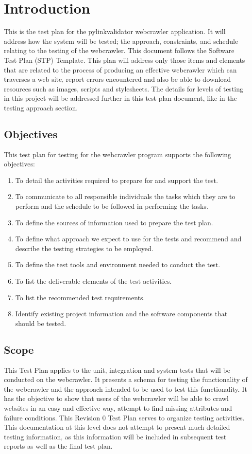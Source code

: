 \documentclass[12pt, titlepage]{article}
\begin{document}
\section{Introduction}
This is the test plan for the pylinkvalidator webcrawler application.  It will address how the system will be tested; the approach, constraints, and schedule relating to the testing of the webcrawler. This document follows the Software Test Plan (STP) Template.
This plan will address only those items and elements that are related to the process of producing an effective webcrawler which can traverses a web site, report errors encountered and also be able to download resources such as images, scripts and stylesheets. The details for levels of testing in this project will be addressed further in this test plan document, like in the testing approach section.

\subsection{Objectives}
This test plan for testing for the webcrawler program supports the following objectives:

\begin{enumerate}
\item To detail the activities required to prepare for and support the test.
\item To communicate to all responsible individuals the tasks which they are to perform and the schedule to be followed in performing the tasks.
\item To define the sources of information used to prepare the test plan.
\item To define what approach we expect to use for the tests and recommend and describe the testing strategies to be employed.
\item To define the test tools and environment needed to conduct the test.
\item To list the deliverable elements of the test activities.
\item  To list the recommended test requirements.
\item  Identify existing project information and the software components that should be tested.
\end{enumerate}

\subsection{Scope}
This Test Plan applies to the unit,  integration and system tests that will be conducted on the webcrawler. It presents a schema for testing the functionality of the webcrawler and the approach intended to be used to test this functionality. It has the objective to show that users of the webcrawler will be able to crawl websites in an easy and effective way, attempt to find missing attributes and failure conditions. This Revision 0 Test Plan serves to organize testing activities. This documentation at this level does not attempt to present much detailed testing information, as this information will be included in subsequent test reports as well as the final test plan.
\end{document}
